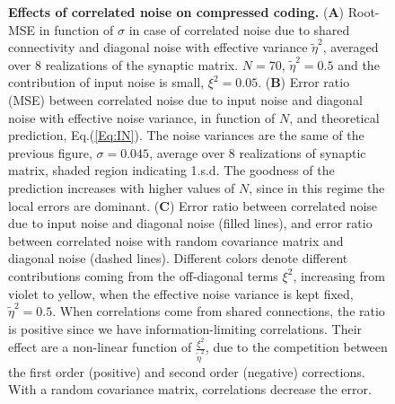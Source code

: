 \documentclass[a4paper]{article}%
\begin{document}
\begin{figure}[ptb]
\centering
{}\caption{\textbf{Effects of
correlated noise on compressed coding.} (\textbf{A}) Root-MSE in function of
$\sigma$ in case of correlated noise due to shared connectivity and diagonal
noise with effective variance $\tilde\eta^{2}$, averaged over 8 realizations
of the synaptic matrix. $N=70$, $\tilde\eta^{2} = 0.5$ and the contribution of
input noise is small, $\xi^{2} = 0.05$. (\textbf{B}) Error ratio (MSE) between
correlated noise due to input noise and diagonal noise with effective noise
variance, in function of $N$, and theoretical prediction, Eq.(\ref{Eq:IN}).
The noise variances are the same of the previous figure, $\sigma=0.045$,
average over 8 realizations of synaptic matrix, shaded region indicating
1.s.d. The goodness of the prediction increases with higher values of $N$,
since in this regime the local errors are dominant. (\textbf{C}) Error ratio
between correlated noise due to input noise and diagonal noise (filled lines),
and error ratio between correlated noise with random covariance matrix and
diagonal noise (dashed lines). Different colors denote different contributions
coming from the off-diagonal terms $\xi^{2}$, increasing from violet to
yellow, when the effective noise variance is kept fixed, $\tilde\eta^{2} =
0.5$. When correlations come from shared connections, the ratio is positive
since we have information-limiting correlations. Their effect are a non-linear
function of $\frac{\xi^{2}}{\tilde\eta^{2}}$, due to the competition between
the first order (positive) and second order (negative) corrections. With a
random covariance matrix, correlations decrease the error.}%
\label{Fig:8}%
\end{figure}\clearpage
\end{document}
